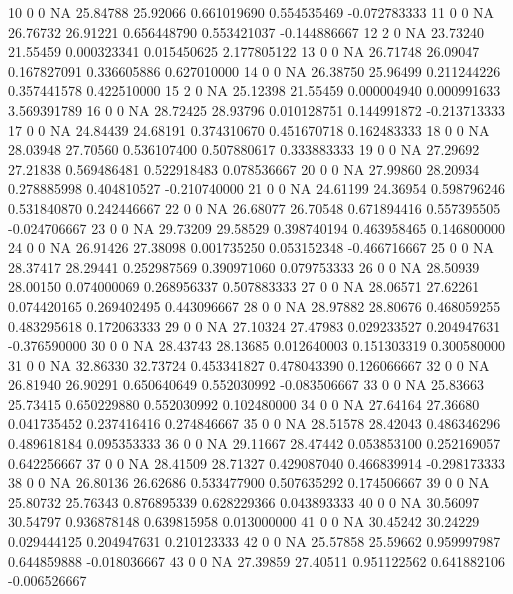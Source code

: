 \documentclass{beamer}
\begin{document}
\begin{frame}[fragile]
\begin{itemize}
\begin{Schunk}
\begin{Soutput}
10       0       0 NA 25.84788 25.92066 0.661019690 0.554535469 -0.072783333
11       0       0 NA 26.76732 26.91221 0.656448790 0.553421037 -0.144886667
12       2       0 NA 23.73240 21.55459 0.000323341 0.015450625  2.177805122
13       0       0 NA 26.71748 26.09047 0.167827091 0.336605886  0.627010000
14       0       0 NA 26.38750 25.96499 0.211244226 0.357441578  0.422510000
15       2       0 NA 25.12398 21.55459 0.000004940 0.000991633  3.569391789
16       0       0 NA 28.72425 28.93796 0.010128751 0.144991872 -0.213713333
17       0       0 NA 24.84439 24.68191 0.374310670 0.451670718  0.162483333
18       0       0 NA 28.03948 27.70560 0.536107400 0.507880617  0.333883333
19       0       0 NA 27.29692 27.21838 0.569486481 0.522918483  0.078536667
20       0       0 NA 27.99860 28.20934 0.278885998 0.404810527 -0.210740000
21       0       0 NA 24.61199 24.36954 0.598796246 0.531840870  0.242446667
22       0       0 NA 26.68077 26.70548 0.671894416 0.557395505 -0.024706667
23       0       0 NA 29.73209 29.58529 0.398740194 0.463958465  0.146800000
24       0       0 NA 26.91426 27.38098 0.001735250 0.053152348 -0.466716667
25       0       0 NA 28.37417 28.29441 0.252987569 0.390971060  0.079753333
26       0       0 NA 28.50939 28.00150 0.074000069 0.268956337  0.507883333
27       0       0 NA 28.06571 27.62261 0.074420165 0.269402495  0.443096667
28       0       0 NA 28.97882 28.80676 0.468059255 0.483295618  0.172063333
29       0       0 NA 27.10324 27.47983 0.029233527 0.204947631 -0.376590000
30       0       0 NA 28.43743 28.13685 0.012640003 0.151303319  0.300580000
31       0       0 NA 32.86330 32.73724 0.453341827 0.478043390  0.126066667
32       0       0 NA 26.81940 26.90291 0.650640649 0.552030992 -0.083506667
33       0       0 NA 25.83663 25.73415 0.650229880 0.552030992  0.102480000
34       0       0 NA 27.64164 27.36680 0.041735452 0.237416416  0.274846667
35       0       0 NA 28.51578 28.42043 0.486346296 0.489618184  0.095353333
36       0       0 NA 29.11667 28.47442 0.053853100 0.252169057  0.642256667
37       0       0 NA 28.41509 28.71327 0.429087040 0.466839914 -0.298173333
38       0       0 NA 26.80136 26.62686 0.533477900 0.507635292  0.174506667
39       0       0 NA 25.80732 25.76343 0.876895339 0.628229366  0.043893333
40       0       0 NA 30.56097 30.54797 0.936878148 0.639815958  0.013000000
41       0       0 NA 30.45242 30.24229 0.029444125 0.204947631  0.210123333
42       0       0 NA 25.57858 25.59662 0.959997987 0.644859888 -0.018036667
43       0       0 NA 27.39859 27.40511 0.951122562 0.641882106 -0.006526667

\end{Soutput}
\end{Schunk}
\end{itemize}
\end{frame}
\end{document}
